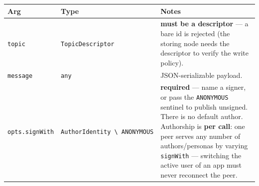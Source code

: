 \documentclass[
  nobib]{tufte-handout}
\newcounter{none} %
\begin{document}
{\def\LTcaptype{none} %
\begin{longtable}[]{@{}
  >{\raggedright\arraybackslash}p{}
  >{\raggedright\arraybackslash}p{}
  >{\raggedright\arraybackslash}p{}@{}}
\toprule\noalign{}
\begin{minipage}[b]{\linewidth}\raggedright
Arg
\end{minipage} & \begin{minipage}[b]{\linewidth}\raggedright
Type
\end{minipage} & \begin{minipage}[b]{\linewidth}\raggedright
Notes
\end{minipage} \\
\midrule\noalign{}
\endhead
\bottomrule\noalign{}
\endlastfoot
\texttt{topic} & \texttt{TopicDescriptor} & \textbf{must be a
descriptor} --- a bare id is rejected (the storing node needs the
descriptor to verify the write policy). \\
\texttt{message} & \texttt{any} & JSON-serializable payload. \\
\texttt{opts.signWith} &
\texttt{AuthorIdentity\ \textbackslash{}\textbar{}\ ANONYMOUS} &
\textbf{required} --- name a signer, or pass the \texttt{ANONYMOUS}
sentinel to publish unsigned. There is no default author. Authorship is
\textbf{per call}: one peer serves any number of authors/personas by
varying \texttt{signWith} --- switching the active user of an app must
never reconnect the peer. \\
\end{longtable}
}
\end{document}
